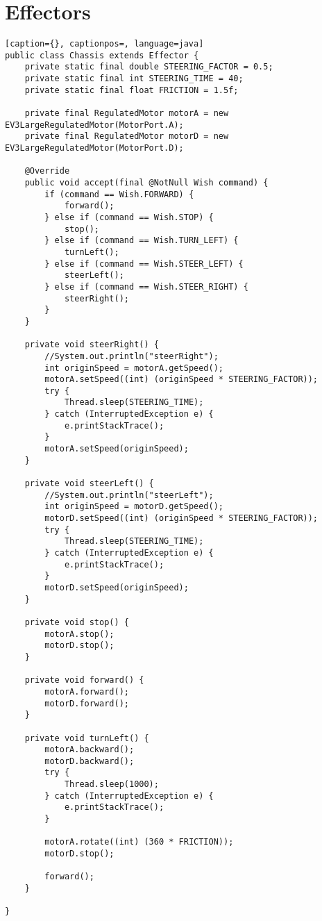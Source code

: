 \section{Effectors}
\begin{lstlisting}[caption={}, captionpos=, language=java]
public class Chassis extends Effector {
    private static final double STEERING_FACTOR = 0.5;
    private static final int STEERING_TIME = 40;
    private static final float FRICTION = 1.5f;

    private final RegulatedMotor motorA = new EV3LargeRegulatedMotor(MotorPort.A);
    private final RegulatedMotor motorD = new EV3LargeRegulatedMotor(MotorPort.D);

    @Override
    public void accept(final @NotNull Wish command) {
        if (command == Wish.FORWARD) {
            forward();
        } else if (command == Wish.STOP) {
            stop();
        } else if (command == Wish.TURN_LEFT) {
            turnLeft();
        } else if (command == Wish.STEER_LEFT) {
            steerLeft();
        } else if (command == Wish.STEER_RIGHT) {
            steerRight();
        }
    }

    private void steerRight() {
        //System.out.println("steerRight");
        int originSpeed = motorA.getSpeed();
        motorA.setSpeed((int) (originSpeed * STEERING_FACTOR));
        try {
            Thread.sleep(STEERING_TIME);
        } catch (InterruptedException e) {
            e.printStackTrace();
        }
        motorA.setSpeed(originSpeed);
    }

    private void steerLeft() {
        //System.out.println("steerLeft");
        int originSpeed = motorD.getSpeed();
        motorD.setSpeed((int) (originSpeed * STEERING_FACTOR));
        try {
            Thread.sleep(STEERING_TIME);
        } catch (InterruptedException e) {
            e.printStackTrace();
        }
        motorD.setSpeed(originSpeed);
    }

    private void stop() {
        motorA.stop();
        motorD.stop();
    }

    private void forward() {
        motorA.forward();
        motorD.forward();
    }

    private void turnLeft() {
        motorA.backward();
        motorD.backward();
        try {
            Thread.sleep(1000);
        } catch (InterruptedException e) {
            e.printStackTrace();
        }

        motorA.rotate((int) (360 * FRICTION));
        motorD.stop();

        forward();
    }

}
\end{lstlisting}

